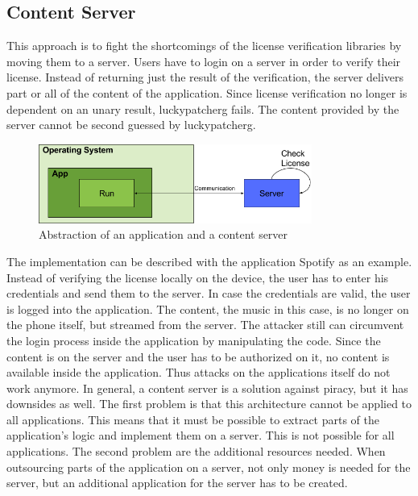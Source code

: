 \subsection{Content Server} \label{section:counter-replace-server}
This approach is to fight the shortcomings of the license verification libraries by moving them to a server.
Users have to login on a server in order to verify their license.
Instead of returning just the result of the verification, the server delivers part or all of the content of the application.
Since license verification no longer is dependent on an unary result, \gls{luckypatcherg} fails.
The content provided by the server cannot be second guessed by \gls{luckypatcherg}.
\newline
\begin{figure}[h]
    \centering
    \includegraphics[width=0.8\textwidth]{data/contentServer.png}
    \caption{Abstraction of an application and a content server}
    \label{fig:contentServer}
\end{figure}
The implementation can be described with the application Spotify \cite{spotify} as an example.
Instead of verifying the license locally on the device, the user has to enter his credentials and send them to the server.
In case the credentials are valid, the user is logged into the application.
The content, the music in this case, is no longer on the phone itself, but streamed from the server.
The attacker still can circumvent the login process inside the application by manipulating the code.
Since the content is on the server and the user has to be authorized on it, no content is available inside the application.
Thus attacks on the applications itself do not work anymore.
\newline
\newline
In general, a content server is a solution against piracy, but it has downsides as well.
The first problem is that this architecture cannot be applied to all applications.
This means that it must be possible to extract parts of the application's logic and implement them on a server.
This is not possible for all applications.
\newline
The second problem are the additional resources needed.
When outsourcing parts of the application on a server, not only money is needed for the server, but an additional application for the server has to be created.
